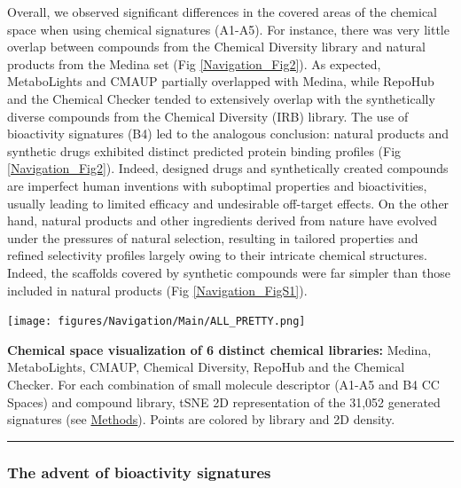 Overall, we observed significant differences in the covered areas of the chemical space when using chemical signatures (A1-A5). For instance, there was very little overlap between compounds from the Chemical Diversity library and natural products from the Medina set (Fig \ref{Navigation_Fig2}). As expected, MetaboLights and CMAUP partially overlapped with Medina, while RepoHub and the Chemical Checker tended to extensively overlap with the synthetically diverse compounds from the Chemical Diversity (IRB) library. The use of bioactivity signatures (B4) led to the analogous conclusion: natural products and synthetic drugs exhibited distinct predicted protein binding profiles (Fig \ref{Navigation_Fig2}). Indeed, designed drugs and synthetically created compounds are imperfect human inventions with suboptimal properties and bioactivities, usually leading to limited efficacy and undesirable off-target effects. On the other hand, natural products and other ingredients derived from nature have evolved under the pressures of natural selection, resulting in tailored properties and refined selectivity profiles largely owing to their intricate chemical structures. Indeed, the scaffolds covered by synthetic compounds were far simpler than those included in natural products (Fig \ref{Navigation_FigS1}). 




\begin{Figure_modified}
  \centering
  \texttt{[image: figures/Navigation/Main/ALL\_PRETTY.png]}
  \caption{\textbf{Chemical space visualization of 6 distinct chemical libraries:} Medina, MetaboLights\cite{yurekten_metabolights_2024, haug_metabolights_2019}, CMAUP\cite{hou_cmaup_2024, zeng_cmaup_2019}, Chemical Diversity, RepoHub\cite{corsello_drug_2017} and the Chemical Checker\cite{duran-frigola_extending_2020}. For each combination of small molecule descriptor (A1-A5 and B4 CC Spaces) and compound library, tSNE 2D representation of the 31,052 generated signatures (see \hyperref[Navigation_Methods]{Methods}). Points are colored by library and 2D density.
}
  \vspace{-5mm}
  \rule[0ex]{\textwidth}{0.5pt}
  \vspace{-9mm}
  \label{Navigation_Fig2}
\end{Figure_modified}

\subsubsection{The advent of bioactivity signatures}

